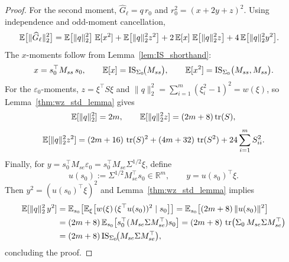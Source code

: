 \begin{proof}
For the second moment, $\widehat G_\ell = q\,r_0$ and $r_0^2=(x+2y+z)^2$.
Using independence and odd-moment cancellation,
\begin{align*}
{\mathbb{E}}\big[\|\widehat G_\ell\|_2^2\big]
&= {\mathbb{E}}\big[\|q\|_2^2\big]\;{\mathbb{E}}[x^2]
+ {\mathbb{E}}\big[\|q\|_2^2 z^2\big]
+ 2\,{\mathbb{E}}[x]\;{\mathbb{E}}\big[\|q\|_2^2 z\big]
+ 4\,{\mathbb{E}}\big[\|q\|_2^2 y^2\big].
\end{align*}
The $x$-moments follow from Lemma~\ref{lem:IS_shorthand}:
\[
x=s_0^\top M_{ss}\,s_0,
\qquad
{\mathbb{E}}[x]=\mathrm{IS}_{\Sigma_0}\!\big(M_{ss}\big),
\qquad
{\mathbb{E}}[x^2]=\mathrm{IS}_{\Sigma_0}\big(M_{ss},M_{ss}\big).
\]
For the $\varepsilon_0$-moments, $z=\xi^\top S\xi$ and $\|q\|_2^2=\sum_{i=1}^m(\xi_i^2-1)^2=w(\xi)$, so Lemma~\ref{thm:wz_std_lemma} gives
\[
{\mathbb{E}}[\|q\|_2^2]=2m,\qquad
{\mathbb{E}}[\|q\|_2^2 z]=(2m+8)\operatorname{tr}(S),
\]
\[
{\mathbb{E}}[\|q\|_2^2 z^2]
=(2m + 16)\,\operatorname{tr}(S)^2+(4m+32)\,\operatorname{tr}(S^2) + 24 \sum_{i=1}^m S_{ii}^2.
\]
Finally, for $y=s_0^\top M_{se}\varepsilon_0=s_0^\top M_{se}\Sigma^{1/2}\xi$, define
\[
u(s_0):=\Sigma^{1/2}M_{se}^\top s_0\in\mathbb R^m,
\qquad
y=u(s_0)^\top \xi.
\]
Then $y^2=(u(s_0)^\top\xi)^2$ and Lemma~\ref{thm:wz_std_lemma} implies
\begin{align*}
{\mathbb{E}}[\|q\|_2^2\,y^2]
&={\mathbb{E}}_{s_0}\!\left[{\mathbb{E}}_{\xi}\!\left[w(\xi)\,(\xi^\top u(s_0))^2\mid s_0\right]\right]
={\mathbb{E}}_{s_0}\!\left[(2m+8)\,\|u(s_0)\|^2\right]\\
&=(2m+8)\,{\mathbb{E}}_{s_0}\!\left[s_0^\top(M_{se}\Sigma M_{se}^\top)s_0\right]
=(2m+8)\,\operatorname{tr}\!\big(\Sigma_0\,M_{se}\Sigma M_{se}^\top\big)\\
&=(2m+8)\,\mathrm{IS}_{\Sigma_0}\!\big(M_{se}\Sigma M_{se}^\top\big),
\end{align*}
concluding the proof.
\end{proof}
